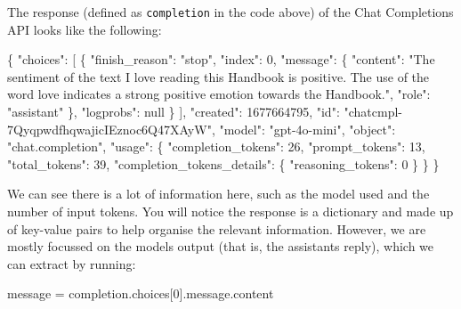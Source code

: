 \documentclass[
  letterpaper,
  DIV=11,
  numbers=noendperiod]{scrreprt}
\newenvironment{Shaded}{\begin{snugshade}}{\end{snugshade}}
\newcommand{\DecValTok}[1]{\textcolor[rgb]{0.68,0.00,0.00}{#1}}
\newcommand{\NormalTok}[1]{\textcolor[rgb]{0.00,0.23,0.31}{#1}}
\newcommand{\OtherTok}[1]{\textcolor[rgb]{0.00,0.23,0.31}{#1}}
\newcommand{\SpecialCharTok}[1]{\textcolor[rgb]{0.37,0.37,0.37}{#1}}
\newcommand{\StringTok}[1]{\textcolor[rgb]{0.13,0.47,0.30}{#1}}
\begin{document}
The response (defined as \texttt{completion} in the code above) of the
Chat Completions API looks like the following:

\begin{Shaded}
\begin{Highlighting}[]
\NormalTok{\{}
  \StringTok{"choices"}\SpecialCharTok{:}\NormalTok{ [}
\NormalTok{    \{}
      \StringTok{"finish\_reason"}\SpecialCharTok{:} \StringTok{"stop"}\NormalTok{,}
      \StringTok{"index"}\SpecialCharTok{:} \DecValTok{0}\NormalTok{,}
      \StringTok{"message"}\SpecialCharTok{:}\NormalTok{ \{}
        \StringTok{"content"}\SpecialCharTok{:} \StringTok{"The sentiment of the text \textquotesingle{}I love reading this Handbook\textquotesingle{} is positive. The use of the word \textquotesingle{}love\textquotesingle{} indicates a strong positive emotion towards the Handbook."}\NormalTok{,}
        \StringTok{"role"}\SpecialCharTok{:} \StringTok{"assistant"}
\NormalTok{      \},}
      \StringTok{"logprobs"}\SpecialCharTok{:}\NormalTok{ null}
\NormalTok{    \}}
\NormalTok{  ],}
  \StringTok{"created"}\SpecialCharTok{:} \DecValTok{1677664795}\NormalTok{,}
  \StringTok{"id"}\SpecialCharTok{:} \StringTok{"chatcmpl{-}7QyqpwdfhqwajicIEznoc6Q47XAyW"}\NormalTok{,}
  \StringTok{"model"}\SpecialCharTok{:} \StringTok{"gpt{-}4o{-}mini"}\NormalTok{,}
  \StringTok{"object"}\SpecialCharTok{:} \StringTok{"chat.completion"}\NormalTok{,}
  \StringTok{"usage"}\SpecialCharTok{:}\NormalTok{ \{}
    \StringTok{"completion\_tokens"}\SpecialCharTok{:} \DecValTok{26}\NormalTok{,}
    \StringTok{"prompt\_tokens"}\SpecialCharTok{:} \DecValTok{13}\NormalTok{,}
    \StringTok{"total\_tokens"}\SpecialCharTok{:} \DecValTok{39}\NormalTok{,}
    \StringTok{"completion\_tokens\_details"}\SpecialCharTok{:}\NormalTok{ \{}
      \StringTok{"reasoning\_tokens"}\SpecialCharTok{:} \DecValTok{0}
\NormalTok{    \}}
\NormalTok{  \}}
\NormalTok{\}}
\end{Highlighting}
\end{Shaded}

We can see there is a lot of information here, such as the model used
and the number of input tokens. You will notice the response is a
dictionary and made up of key-value pairs to help organise the relevant
information. However, we are mostly focussed on the models output (that
is, the assistants reply), which we can extract by running:

\begin{Shaded}
\begin{Highlighting}[]
\NormalTok{message }\OtherTok{=}\NormalTok{ completion.choices[}\DecValTok{0}\NormalTok{].message.content}
\end{Highlighting}
\end{Shaded}
\end{document}
